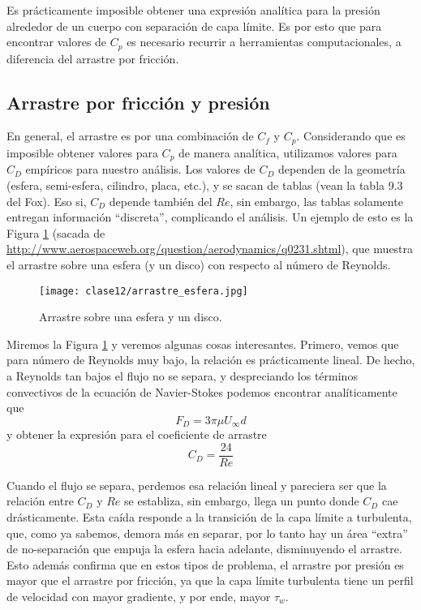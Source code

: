 Es prácticamente imposible obtener una expresión analítica para la presión alrededor de un cuerpo con separación de capa límite. 
Es por esto que para encontrar valores de $C_p$ es necesario recurrir a herramientas computacionales, a diferencia del arrastre por fricción.

\subsection*{Arrastre por fricción y presión}

En general, el arrastre es por una combinación de $C_f$ y $C_p$.
Considerando que es imposible obtener valores para $C_p$ de manera analítica, utilizamos valores para $C_D$ empíricos para nuestro análisis.
Los valores de $C_D$ dependen de la geometría (esfera, semi-esfera, cilindro, placa, etc.), y se sacan de tablas (vean la tabla 9.3 del Fox).
Eso si, $C_D$ depende también del $Re$, sin embargo, las tablas solamente entregan información ``discreta'', complicando el análisis.
Un ejemplo de esto es la Figura \ref{fig:arrastre_esfera} (sacada de \url{http://www.aerospaceweb.org/question/aerodynamics/q0231.shtml}), que muestra el arrastre sobre una esfera (y un disco) con respecto al número de Reynolds.
%
\begin{figure}
\centering
\texttt{[image: clase12/arrastre\_esfera.jpg]}
\caption{Arrastre sobre una esfera y un disco.}
\label{fig:arrastre_esfera}
\end{figure}

Miremos la Figura \ref{fig:arrastre_esfera} y veremos algunas cosas interesantes.
Primero, vemos que para número de Reynolds muy bajo, la relación es prácticamente lineal.
De hecho, a Reynolds tan bajos el flujo no se separa, y despreciando los términos convectivos de la ecuación de Navier-Stokes podemos encontrar analíticamente que
%
\begin{equation}
F_D = 3\pi\mu U_\infty d
\end{equation}
%
y obtener la expresión para el coeficiente de arrastre 
%
\begin{equation}
C_D = \frac{24}{Re}
\end{equation}

Cuando el flujo se separa, perdemos esa relación lineal y pareciera ser que la relación entre $C_D$ y $Re$ se establiza, sin embargo, llega un punto donde $C_D$ cae drásticamente. 
Esta caída responde a la transición de la capa límite a turbulenta, que, como ya sabemos, demora más en separar, por lo tanto hay un área ``extra'' de no-separación que empuja la esfera hacia adelante, disminuyendo el arrastre.
Esto además confirma que en estos tipos de problema, el arrastre por presión es mayor que el arrastre por fricción, ya que la capa límite turbulenta tiene un perfil de velocidad con mayor gradiente, y por ende, mayor $\tau_w$.

